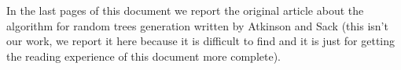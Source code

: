 \documentclass[twoside,openright,titlepage,fleqn,
	headinclude,11pt,a4paper,BCOR5mm,footinclude
	]{scrbook}
\begin{document}
In the last pages of this document we report the original article
about the algorithm for random trees generation written by Atkinson
and Sack (this isn't our work, we report it here because it is
difficult to find and it is just for getting the reading experience of
this document more complete).



% 

% 
\end{document}
